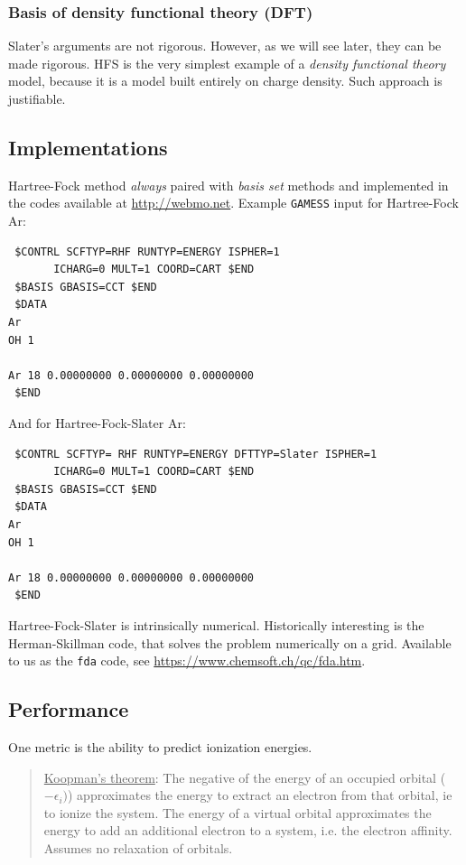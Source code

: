 \documentclass[11pt]{article}
\begin{document}
\subsubsection{Basis of density functional theory (DFT)}
\label{sec:org6c8c565}
Slater's arguments are not rigorous. However, as we will see later, they can be made rigorous.  HFS is the very simplest example of a \emph{density functional theory} model, because it is a model built entirely on charge density.  Such approach is justifiable.

\subsection{Implementations}
\label{sec:orge054d62}
Hartree-Fock method \emph{always} paired with \emph{basis set} methods and implemented in the codes available at \url{http://webmo.net}.  Example \texttt{GAMESS} input for Hartree-Fock Ar:

\begin{verbatim}
 $CONTRL SCFTYP=RHF RUNTYP=ENERGY ISPHER=1
       ICHARG=0 MULT=1 COORD=CART $END
 $BASIS GBASIS=CCT $END
 $DATA
Ar
OH 1

Ar 18 0.00000000 0.00000000 0.00000000
 $END
\end{verbatim}

And for Hartree-Fock-Slater Ar:

\begin{verbatim}
 $CONTRL SCFTYP= RHF RUNTYP=ENERGY DFTTYP=Slater ISPHER=1
       ICHARG=0 MULT=1 COORD=CART $END
 $BASIS GBASIS=CCT $END
 $DATA
Ar
OH 1

Ar 18 0.00000000 0.00000000 0.00000000
 $END
\end{verbatim}

Hartree-Fock-Slater is intrinsically numerical.  Historically interesting is the Herman-Skillman code, that solves the problem numerically on a grid.  Available to us as the \texttt{fda} code, see \url{https://www.chemsoft.ch/qc/fda.htm}.

\subsection{Performance}
\label{sec:org1bdb1e1}
One metric is the ability to predict ionization energies.  
\begin{quote}
\uline{Koopman’s theorem}: The negative of the energy of an occupied orbital (\(-\epsilon_i)\)) approximates the energy to extract an electron from that orbital, ie to ionize the system.   The energy of a virtual orbital approximates the energy to add an additional electron to a system, i.e. the electron affinity.  Assumes no relaxation of orbitals.  
\end{quote}
\end{document}
